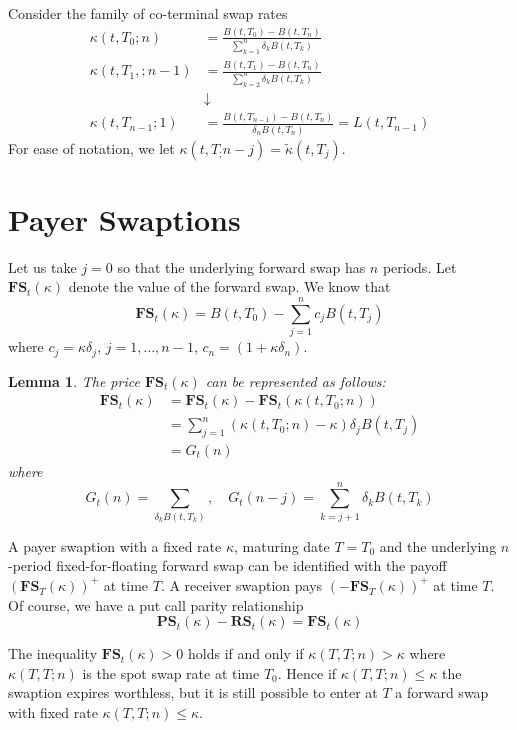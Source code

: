 \documentclass[10pt, oneside, reqno]{amsbook}
\theoremstyle{plain}%
\newtheorem{lem}[thm]{Lemma}
\theoremstyle{definition}
\theoremstyle{remark}
\numberwithin{equation}{chapter}
\begin{document}
Consider the family of co-terminal swap rates \begin{align*}
    \kappa(t, T_0; n) &= \frac{B(t, T_0) - B(t, T_n)}{\sum_{k=1}^n \delta_k B(t, T_k)} \\
    \kappa(t, T_1,; n-1) &= \frac{B(t, T_1) - B(t, T_n)}{\sum_{k=2}^n \delta_k B(t, T_k)} \\
    &\downarrow \\
    \kappa(t, T_{n-1}; 1) &= \frac{B(t, T_{n-1}) - B(t, T_n)}{\delta_n B(t, T_n)} = L(t, T_{n-1}) 
\end{align*}  For ease of notation, we let $\kappa(t, T_; n-j) = \tilde \kappa(t, T_j)$.

\section{Payer Swaptions} %
\label{sec:payer_swaptions}
Let us take $j = 0$ so that the underlying forward swap has $n$ periods.  Let $\mathbf{FS}_t(\kappa)$ denote the value of the forward swap. We know that \[
    \mathbf{FS}_t(\kappa) = B(t, T_0) - \sum_{j=1}^n c_j B(t, T_j)
\] where $c_j = \kappa \delta_j$, $j = 1, \dots, n-1$, $c_n = (1 + \kappa \delta_n)$.  

\begin{lem}
    The price $\mathbf{FS}_t(\kappa)$ can be represented as follows: \begin{align*}
        \mathbf{FS}_t(\kappa) &= \mathbf{FS}_t(\kappa) - \mathbf{FS}_t(\kappa(t, T_0; n)) \\
                    &= \sum_{j=1}^n \left( \kappa(t, T_0; n) - \kappa \right) \delta_j B(t, T_j) \\
                    &= G_t(n)
    \end{align*}  where \[
        G_t(n) = \sum_{\delta_k B(t, T_k)}, \quad G_t(n-j) = \sum_{k=j+1}^n \delta_k B(t, T_k)
    \]  
\end{lem}

A payer swaption with a fixed rate $\kappa$, maturing date $T = T_0$ and the underlying $n$-period fixed-for-floating forward swap can be identified with the payoff $\left(\mathbf{FS}_T(\kappa) \right)^+$ at time $T$.  A receiver swaption pays $\left(-\mathbf{FS}_T(\kappa) \right)^+$ at time $T$.  Of course, we have a put call parity relationship \[
    \mathbf{PS}_t(\kappa) - \mathbf{RS}_t(\kappa) = \mathbf{FS}_t(\kappa)
\]

The inequality $\mathbf{FS}_t(\kappa) > 0$ holds if and only if $\kappa(T, T; n) > \kappa$ where $\kappa(T, T; n)$ is the spot swap rate at time $T_0$. Hence if $\kappa(T, T; n) \leq \kappa$ the swaption expires worthless, but it is still possible to enter at $T$ a forward swap with fixed rate $\kappa(T, T; n) \leq \kappa$.
\end{document}
